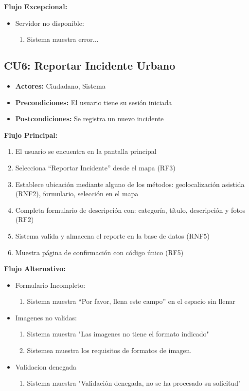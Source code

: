 \begin{multicols}{2}
\textbf{Flujo Excepcional:}
\begin{itemize}
    \item Servidor no disponible:
    \begin{enumerate}
        \item Sistema muestra error...
    \end{enumerate}
\end{itemize}

\subsection*{CU6: Reportar Incidente Urbano}
\begin{itemize}
    \item \textbf{Actores:} Ciudadano, Sistema
    \item \textbf{Precondiciones:} El usuario tiene su sesión iniciada
    \item \textbf{Postcondiciones:} Se registra un nuevo incidente
\end{itemize}
\textbf{Flujo Principal:}
\begin{enumerate}
    \item El usuario se encuentra en la pantalla principal
    \item Selecciona ``Reportar Incidente'' desde el mapa (RF3)
    \item Establece ubicación mediante alguno de los métodos: geolocalización asistida (RNF2), formulario, selección en el mapa
    \item Completa formulario de descripción con: categoría, título, descripción y fotos (RF2)
    \item Sistema valida y almacena el reporte en la base de datos (RNF5)
    \item Muestra página de confirmación con código único (RF5)
\end{enumerate}

\textbf{Flujo Alternativo:}
\begin{itemize}
    \item Formulario Incompleto:
    \begin{enumerate}
        \item Sistema muestra “Por favor, llena este campo” en el espacio sin llenar
    \end{enumerate}
    \item Imagenes no validas:
    \begin{enumerate}
        \item Sistema muestra "Las imagenes no tiene el formato indicado"
        \item Sistemea muestra los requisitos de formatos de imagen.
    \end{enumerate}
    \item Validacion denegada
    \begin{enumerate}
        \item Sistema muestra "Validación denegada, no se ha procesado su solicitud"
    \end{enumerate}
\end{itemize}


\end{multicols}
